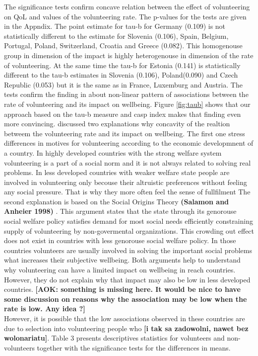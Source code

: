 \documentclass[10pt, letterpaper]{article}
\begin{document}
\begin{spacing}{1.4}
 The significance tests confirm concave relation between the effect of volunteering on QoL and values of the volunteering rate. The p-values for the tests are given in the Appndix.  The point estimate for tau-b for Germany (0.109) is not statistically different to the estimate for Slovenia (0.106), Spain, Belgium, Portugal, Poland, Switzerland, Croatia and Greece (0.082). This homogenouse group in dimension of the impact is highly heterogenouse in dimension of the rate of volunteering. At the same time the tau-b for Estonia (0.141) is statistically different to the tau-b estimates in Slovenia (0.106), Poland(0.090) and Czech Republic (0.053) but it is the same as in France, Luxemburg and Austria. The tests confirm the finding in \citet{haski09} about non-linear pattern of associations between  the rate of volunteering and its impact on wellbeing. Figure \ref{fig:taub} shows that our approach based on the tau-b measure and casp index makes that finding even more convincing. \citet{haski09} discussed two explanations why concavity of the realtion betweem the volunteering rate and its impact on wellbeing. The first one stress differences in motives for volunteering according to the economic developmnent of a country. In highly developed countries with the strong welfare system volunteering is a part of a social norm and it is not always related to solving real problems. In less developed countries with weaker welfare state people are involved in volunteering only becouse their altruistic preferences without feeling any social pressure. That is why they more often feel the sense of fullfilment  The second explanation is based on the Social Origins Theory \textbf{(Salamon and Anheier 1998) }. This argument states that the state through its genorouse social welfare policy satisfies demand for most social needs efficiently constraining supply of volunteering by non-govermental organizations. This crowding out effect does not exist in countries with less genorouse social welfare policy. In those countries volunteers are usually involved in solving the important social problems what increases their subjective wellbeing. Both arguments help to understand why volunteering can have a limited impact on wellbeing in reach countries. However, they do not explain why that impact may also be low in less developed countries. \textbf{[AOK: something is missing here. It would be nice to have some discussion on reasons why the association may be low when the rate is low. Any idea ?]} \\

However, it is possible that the low associations observed in these countries are due to selection into volunteering people who \textbf{[i tak sa zadowolni, nawet bez wolonariatu]}. Table 3 presents descriptives statistics for volunteers and non-volunteers together with the significance tests for the differences in means.  \\


\end{spacing}
\end{document}
